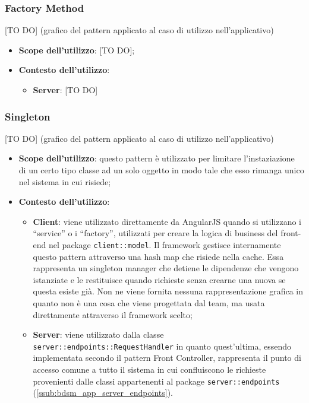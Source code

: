 	\subsubsection{Factory Method} %
	\label{ssub:factory_method}
	[TO DO] (grafico del pattern applicato al caso di utilizzo nell'applicativo)
		\begin{itemize}
			\item \textbf{Scope dell'utilizzo}: [TO DO];
			\item \textbf{Contesto dell'utilizzo}:
				\begin{itemize}
					\item \textbf{Server}: [TO DO]
				\end{itemize}
		\end{itemize}


	\subsubsection{Singleton} %
	\label{ssub:singleton}
	[TO DO] (grafico del pattern applicato al caso di utilizzo nell'applicativo)
		\begin{itemize}
			\item \textbf{Scope dell'utilizzo}: questo pattern è utilizzato per limitare l'instaziazione di un certo tipo classe ad un solo oggetto in modo tale che esso rimanga unico nel sistema in cui risiede;
			\item \textbf{Contesto dell'utilizzo}:
				\begin{itemize}
					\item \textbf{Client}: viene utilizzato direttamente da AngularJS quando si utilizzano i ``service'' o i ``factory'', utilizzati per creare la logica di business del front-end nel package \texttt{client::model}. Il framework gestisce internamente questo pattern attraverso una hash map che risiede nella cache. Essa rappresenta un singleton manager che detiene le dipendenze che vengono istanziate e le restituisce quando richieste senza crearne una nuova se questa esiste già. \newline
					Non ne viene fornita nessuna rappresentazione grafica in quanto non è una cosa che viene progettata dal team, ma usata direttamente attraverso il framework scelto;
					\item \textbf{Server}: viene utilizzato dalla classe \texttt{server::endpoints::RequestHandler} in quanto quest'ultima, essendo implementata secondo il pattern Front Controller, rappresenta il punto di accesso comune a tutto il sistema in cui confluiscono le richieste provenienti dalle classi appartenenti al package \texttt{server::endpoints} (\ref{ssub:bdsm_app_server_endpoints}).
				\end{itemize}
		\end{itemize}
